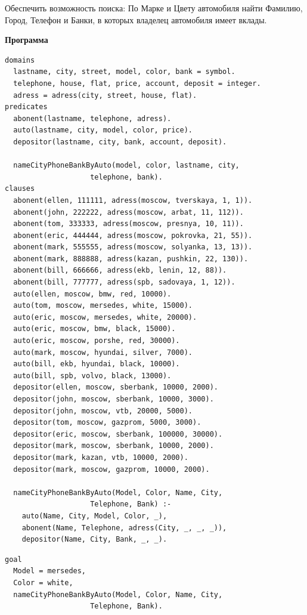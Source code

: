 \documentclass[a4paper,14pt]{extreport} %
\begin{document}
\hfill

Обеспечить возможность поиска: По Марке и Цвету автомобиля найти Фамилию, Город, Телефон и Банки, в которых владелец автомобиля имеет вклады. 

\hfill

\textbf{Программа}

\begin{lstlisting}
domains
  lastname, city, street, model, color, bank = symbol.
  telephone, house, flat, price, account, deposit = integer.
  adress = adress(city, street, house, flat).
predicates
  abonent(lastname, telephone, adress).
  auto(lastname, city, model, color, price).
  depositor(lastname, city, bank, account, deposit).
  
  nameCityPhoneBankByAuto(model, color, lastname, city, 
					telephone, bank).
clauses
  abonent(ellen, 111111, adress(moscow, tverskaya, 1, 1)).
  abonent(john, 222222, adress(moscow, arbat, 11, 112)).
  abonent(tom, 333333, adress(moscow, presnya, 10, 11)).
  abonent(eric, 444444, adress(moscow, pokrovka, 21, 55)).
  abonent(mark, 555555, adress(moscow, solyanka, 13, 13)).
  abonent(mark, 888888, adress(kazan, pushkin, 22, 130)).
  abonent(bill, 666666, adress(ekb, lenin, 12, 88)).
  abonent(bill, 777777, adress(spb, sadovaya, 1, 12)).
  auto(ellen, moscow, bmw, red, 10000).
  auto(tom, moscow, mersedes, white, 15000).
  auto(eric, moscow, mersedes, white, 20000).
  auto(eric, moscow, bmw, black, 15000).
  auto(eric, moscow, porshe, red, 30000).
  auto(mark, moscow, hyundai, silver, 7000).
  auto(bill, ekb, hyundai, black, 10000).
  auto(bill, spb, volvo, black, 13000).
  depositor(ellen, moscow, sberbank, 10000, 2000).
  depositor(john, moscow, sberbank, 10000, 3000).
  depositor(john, moscow, vtb, 20000, 5000).
  depositor(tom, moscow, gazprom, 5000, 3000).
  depositor(eric, moscow, sberbank, 100000, 30000).
  depositor(mark, moscow, sberbank, 10000, 2000).
  depositor(mark, kazan, vtb, 10000, 2000).
  depositor(mark, moscow, gazprom, 10000, 2000).
  
  nameCityPhoneBankByAuto(Model, Color, Name, City, 
					Telephone, Bank) :-
    auto(Name, City, Model, Color, _),
    abonent(Name, Telephone, adress(City, _, _, _)),
    depositor(Name, City, Bank, _, _).
\end{lstlisting}

\begin{lstlisting}[caption=Пример 1. ]
goal
  Model = mersedes,
  Color = white,
  nameCityPhoneBankByAuto(Model, Color, Name, City, 
					Telephone, Bank).
\end{lstlisting}
\end{document}
